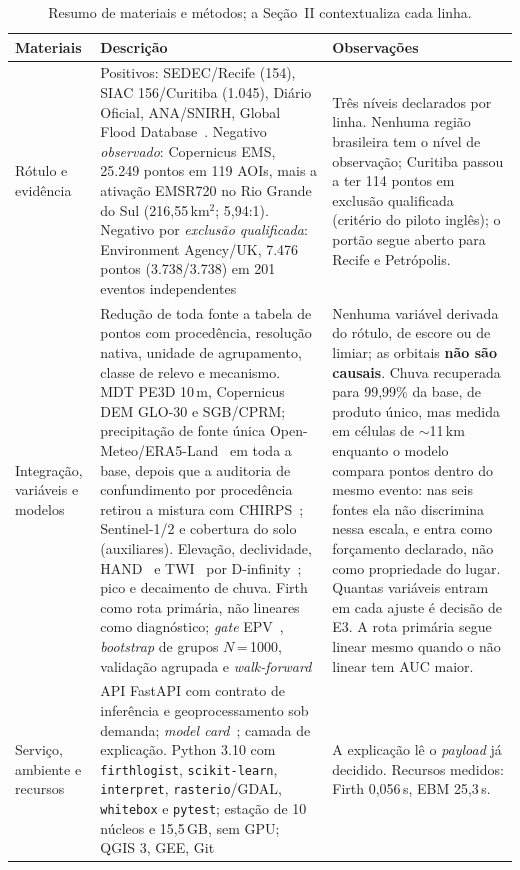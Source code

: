 \documentclass[conference]{IEEEtran}
\begin{document}
\begin{table}[!t]
\caption{Resumo de materiais e métodos; a Seção~II contextualiza cada linha.}
\label{tab:mm}
\centering
\renewcommand{\arraystretch}{0.95}
\scriptsize
\begin{tabular}{@{}>{\raggedright\arraybackslash}p{2.05cm}>{\raggedright\arraybackslash}p{7.6cm}>{\raggedright\arraybackslash}p{6.5cm}@{}}
\toprule
\textbf{Materiais} & \textbf{Descrição} & \textbf{Observações} \\
\midrule
Rótulo e evidência &
Positivos: SEDEC/Recife (154), SIAC 156/Curitiba (1.045), Diário Oficial,
ANA/SNIRH, Global Flood Database~\cite{tellman2021}. Negativo \emph{observado}:
Copernicus EMS, 25.249 pontos em 119 AOIs, mais a ativação EMSR720 no Rio Grande do
Sul (216,55\,km$^2$; 5,94:1). Negativo por \emph{exclusão qualificada}: Environment
Agency/UK, 7.476 pontos (3.738/3.738) em 201 eventos independentes &
Três níveis declarados por linha. Nenhuma região brasileira tem o nível de
observação; Curitiba passou a ter 114 pontos em exclusão qualificada
(critério do piloto inglês); o portão segue aberto para Recife e
Petrópolis. \\
Integração, variáveis e modelos &
Redução de toda fonte a tabela de pontos com procedência, resolução nativa, unidade
de agrupamento, classe de relevo e mecanismo. MDT PE3D 10\,m, Copernicus DEM GLO-30 e
SGB/CPRM; precipitação de fonte única Open-Meteo/ERA5-Land~\cite{munoz2021} em toda a
base, depois que a auditoria de confundimento por procedência retirou a mistura com
CHIRPS~\cite{funk2015}; Sentinel-1/2 e cobertura
do solo (auxiliares). Elevação, declividade, HAND~\cite{renno2008} e TWI~\cite{beven1979}
por D-infinity~\cite{tarboton1997}; pico e decaimento de chuva. Firth~\cite{firth1993}
como rota primária, não lineares como diagnóstico; \emph{gate} EPV~\cite{peduzzi1996},
\emph{bootstrap} de grupos $N$\,=\,1000, validação agrupada e \emph{walk-forward} &
Nenhuma variável derivada do rótulo, de escore ou de limiar; as orbitais \textbf{não
são causais}. Chuva recuperada para 99,99\% da base, de produto único, mas medida em
células de $\sim$11\,km enquanto o modelo compara pontos dentro do mesmo evento: nas
seis fontes ela não discrimina nessa escala, e entra como forçamento declarado, não
como propriedade do lugar. Quantas variáveis entram em cada ajuste é decisão de E3. A rota primária segue linear mesmo quando o
não linear tem AUC maior. \\
Serviço, ambiente e recursos &
API FastAPI com contrato de inferência e geoprocessamento sob demanda; \emph{model
card}~\cite{mitchell2019}; camada de explicação. Python 3.10 com \texttt{firthlogist},
\texttt{scikit-learn}, \texttt{interpret}, \texttt{rasterio}/GDAL, \texttt{whitebox} e
\texttt{pytest}; estação de 10 núcleos e 15,5\,GB, sem GPU; QGIS 3, GEE, Git &
A explicação lê o \emph{payload} já decidido. Recursos medidos: Firth 0,056\,s,
EBM 25,3\,s. \\
\bottomrule
\end{tabular}
\end{table}
\end{document}
